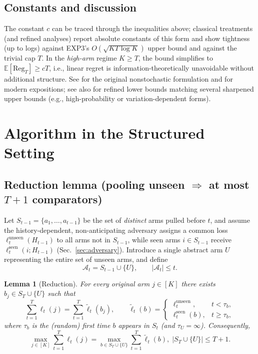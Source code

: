 \documentclass[10pt,twocolumn]{article}
\newcommand{\E}{\mathbb{E}}
\newcommand{\Reg}{\mathrm{Reg}}
\newtheorem{lemma}[theorem]{Lemma}
\theoremstyle{definition}
\theoremstyle{remark}
\begin{document}
\subsection{Constants and discussion}
\label{subsec:constants-discussion}
The constant $c$ can be traced through the inequalities above; classical treatments (and refined analyses) report absolute constants of this form and show tightness (up to logs) against EXP3’s $O(\sqrt{KT\log K})$ upper bound and against the trivial cap $T$. In the \emph{high-arm} regime $K\ge T$, the bound simplifies to $\E[\Reg_T]\ge cT$, i.e., linear regret is information-theoretically unavoidable without additional structure. See \citet{Auer2002Nonstochastic} for the original nonstochastic formulation and \citet{BubeckCesaBianchi2012,LS20} for modern expositions; see also \citet{GerchinovitzLattimore2016} for refined lower bounds matching several sharpened upper bounds (e.g., high-probability or variation-dependent forms).


\section{Algorithm in the Structured Setting}
\label{sec:algorithm}

\subsection{Reduction lemma (pooling unseen $\Rightarrow$ at most $T{+}1$ comparators)}
Let $S_{t-1}=\{a_1,\dots,a_{t-1}\}$ be the set of \emph{distinct} arms pulled before $t$, and assume the history-dependent, non-anticipating adversary assigns a common loss $\ell_t^{\mathrm{unseen}}(H_{t-1})$ to all arms not in $S_{t-1}$, while seen arms $i\in S_{t-1}$ receive $\ell_t^{\mathrm{seen}}(i;H_{t-1})$ (Sec.~\ref{sec:adversary}). Introduce a single abstract arm $U$ representing the entire set of unseen arms, and define
\[
  \mathcal{A}_t = S_{t-1}\cup\{U\}, \qquad |\mathcal{A}_t|\le t.
\]

\begin{lemma}[Reduction]
  \label{lem:reduction}
  For every original arm $j\in[K]$ there exists $b_j\in S_T\cup\{U\}$ such that
  \[
    \sum_{t=1}^T \ell_t(j)=\sum_{t=1}^T \tilde\ell_t(b_j),\qquad
    \tilde\ell_t(b)=
    \begin{cases}
      \ell_t^{\mathrm{unseen}},  & t<\tau_b,    \\
      \ell_t^{\mathrm{seen}}(b), & t\ge \tau_b,
    \end{cases}
  \]
  where $\tau_b$ is the (random) first time $b$ appears in $S_t$ (and $\tau_U=\infty$). Consequently,
  \[
    \max_{j\in[K]}\sum_{t=1}^T \ell_t(j)
    =
    \max_{b\in S_T\cup\{U\}} \sum_{t=1}^T \tilde\ell_t(b),
    \; |S_T\cup\{U\}|\le T{+}1.
  \]
\end{lemma}
\end{document}
